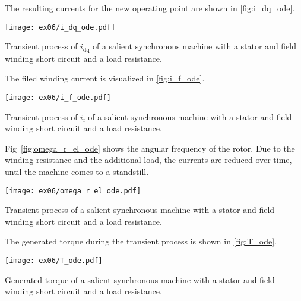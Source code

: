 \FloatBarrier


\begin{solutionblock}
    The resulting currents for the new operating point are shown in \autoref{fig:i_dq_ode}.
    \begin{solutionfigure}[ht]
        \centering
        \texttt{[image: ex06/i\_dq\_ode.pdf]}
        \caption{Transient process of $i_{\mathrm{dq}}$ of a salient synchronous machine with a stator and field winding short circuit and a load resistance.}
        \label{fig:i_dq_ode}
    \end{solutionfigure}

    The filed winding current is visualized in \autoref{fig:i_f_ode}.
    \begin{solutionfigure}[ht]
        \centering
        \texttt{[image: ex06/i\_f\_ode.pdf]}
        \caption{Transient process of $i_{\mathrm{f}}$ of a salient synchronous machine with a stator and field winding short circuit and a load resistance.}
        \label{fig:i_f_ode}
    \end{solutionfigure}

    Fig~\ref{fig:omega_r_el_ode} shows the angular frequency of the rotor. Due to the winding resistance and the additional load, the currents are reduced over time, until the machine comes to a standstill.
    \begin{solutionfigure}[ht]
        \centering
        \texttt{[image: ex06/omega\_r\_el\_ode.pdf]}
        \caption{Transient process of a salient synchronous machine with a stator and field winding short circuit and a load resistance.}
        \label{fig:omega_r_el_ode}
    \end{solutionfigure}

    The generated torque during the transient process is shown in \autoref{fig:T_ode}.
    \begin{solutionfigure}[ht]
        \centering
        \texttt{[image: ex06/T\_ode.pdf]}
        \caption{Generated torque of a salient synchronous machine with a stator and field winding short circuit and a load resistance.}
        \label{fig:T_ode}
    \end{solutionfigure}


\end{solutionblock}

